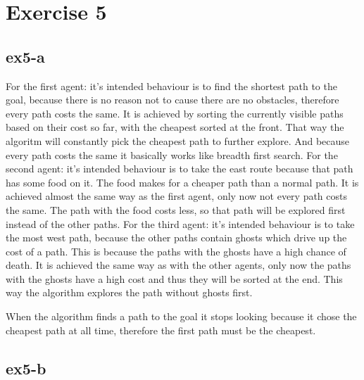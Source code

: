 \section{Exercise 5}
\subsection{ex5-a}
For the first agent: it's intended behaviour is to find the shortest path to the goal, because there is no
reason not to cause there are no obstacles, therefore every path costs the same. 
It is achieved by sorting the currently visible paths based on their cost so far, with the cheapest sorted 
at the front. That way the algoritm will constantly pick the cheapest path to further explore. 
And because every path costs the same it basically works like breadth first search.
For the second agent: it's intended behaviour is to take the east route because that path has some food on it.
The food makes for a cheaper path than a normal path. It is achieved almost the same way as the first agent, 
only now not every path costs the same. The path with the food costs less, so that path will be explored 
first instead of the other paths.
For the third agent: it's intended behaviour is to take the most west path, because the other paths contain 
ghosts which drive up the cost of a path. This is because the paths with the ghosts have a high chance of death.
It is achieved the same way as with the other agents, only now the paths with the ghosts have a high cost and 
thus they will be sorted at the end. This way the algorithm explores the path without ghosts first.

When the algorithm finds a path to the goal it stops looking because it chose the cheapest path at all time,
therefore the first path must be the cheapest.


\subsection{ex5-b}
